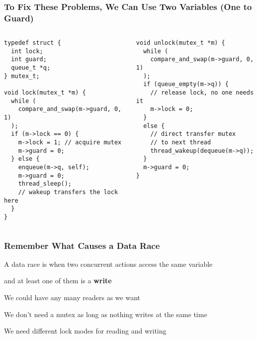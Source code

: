   \begin{frame}[fragile]
    \frametitle{To Fix These Problems, We Can Use Two Variables (One to Guard)}

    \begin{columns}
      \begin{column}{0.5\textwidth}
        \begin{lstlisting}[basicstyle=\scriptsize\ttfamily]
typedef struct {
  int lock;
  int guard;
  queue_t *q;
} mutex_t;

void lock(mutex_t *m) {
  while (
    compare_and_swap(m->guard, 0, 1)
  );
  if (m->lock == 0) {
    m->lock = 1; // acquire mutex
    m->guard = 0;
  } else {
    enqueue(m->q, self);
    m->guard = 0;
    thread_sleep();
    // wakeup transfers the lock here
  }
}
        \end{lstlisting}
      \end{column}
      \begin{column}{0.5\textwidth}
        \begin{lstlisting}[basicstyle=\scriptsize\ttfamily]
void unlock(mutex_t *m) {
  while (
    compare_and_swap(m->guard, 0, 1)
  );
  if (queue_empty(m->q)) {
    // release lock, no one needs it
    m->lock = 0; 
  }
  else {
    // direct transfer mutex
    // to next thread
    thread_wakeup(dequeue(m->q));
  }
  m->guard = 0;
}
        \end{lstlisting}
      \end{column}
    \end{columns}
  \end{frame}

  \begin{frame}
    \frametitle{Remember What Causes a Data Race}

    A data race is when two concurrent actions access the same variable

    and at least one of them is a \textbf{write}

    \vspace{2em}

    We could have any many readers as we want

    \hspace{2em} We don't need a mutex as long as nothing writes at the same
    time

    \vspace{2em}

    We need different lock modes for reading and writing
  \end{frame}

